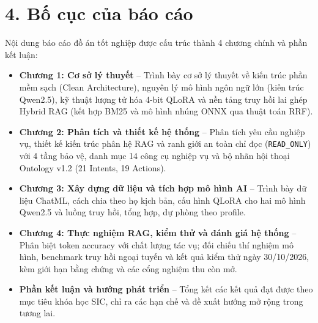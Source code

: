 \section*{4. Bố cục của báo cáo}
{}

Nội dung báo cáo đồ án tốt nghiệp được cấu trúc thành 4 chương chính và phần kết luận:
\begin{itemize}[nosep]
  \item \textbf{Chương 1: Cơ sở lý thuyết} -- Trình bày cơ sở lý thuyết về kiến trúc phần mềm sạch (Clean Architecture), nguyên lý mô hình ngôn ngữ lớn (kiến trúc Qwen2.5), kỹ thuật lượng tử hóa 4-bit QLoRA và nền tảng truy hồi lai ghép Hybrid RAG (kết hợp BM25 và mô hình nhúng ONNX qua thuật toán RRF).
  \item \textbf{Chương 2: Phân tích và thiết kế hệ thống} -- Phân tích yêu cầu nghiệp vụ, thiết kế kiến trúc phân hệ RAG và ranh giới an toàn chỉ đọc (\texttt{READ\_ONLY}) với 4 tầng bảo vệ, danh mục 14 công cụ nghiệp vụ và bộ nhãn hội thoại Ontology v1.2 (21 Intents, 19 Actions).
  \item \textbf{Chương 3: Xây dựng dữ liệu và tích hợp mô hình AI} -- Trình bày dữ liệu ChatML, cách chia theo họ kịch bản, cấu hình QLoRA cho hai mô hình Qwen2.5 và luồng truy hồi, tổng hợp, dự phòng theo profile.
  \item \textbf{Chương 4: Thực nghiệm RAG, kiểm thử và đánh giá hệ thống} -- Phân biệt token accuracy với chất lượng tác vụ; đối chiếu thí nghiệm mô hình, benchmark truy hồi ngoại tuyến và kết quả kiểm thử ngày 30/10/2026, kèm giới hạn bằng chứng và các cổng nghiệm thu còn mở.
  \item \textbf{Phần kết luận và hướng phát triển} -- Tổng kết các kết quả đạt được theo mục tiêu khóa học SIC, chỉ ra các hạn chế và đề xuất hướng mở rộng trong tương lai.
\end{itemize}
